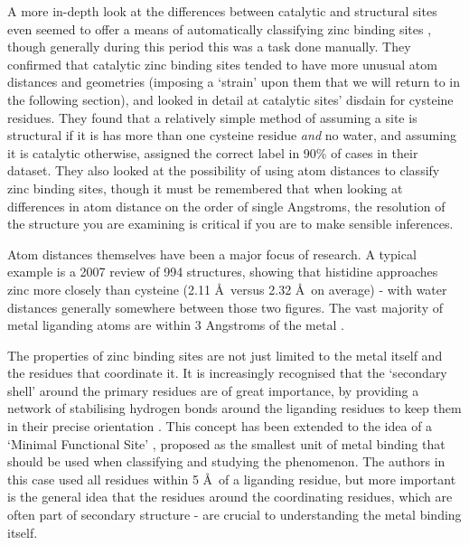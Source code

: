 A more in-depth look at the differences between catalytic and structural sites even seemed to offer a means of automatically classifying zinc binding sites \cite{lee2008physical}, though generally during this period this was a task done manually. They confirmed that catalytic zinc binding sites tended to have more unusual atom distances and geometries (imposing a `strain' upon them that we will return to in the following section), and looked in detail at catalytic sites' disdain for cysteine residues. They found that a relatively simple method of assuming a site is structural if it is has more than one cysteine residue \textit{and} no water, and assuming it is catalytic otherwise, assigned the correct label in 90\% of cases in their dataset. They also looked at the possibility of using atom distances to classify zinc binding sites, though it must be remembered that when looking at differences in atom distance on the order of single Angstroms, the resolution of the structure you are examining is critical if you are to make sensible inferences.

Atom distances themselves have been a major focus of research. A typical example is a 2007 review \cite{tamames2007analysis} of 994 structures, showing that histidine approaches zinc more closely than cysteine (2.11 \AA \ versus 2.32 \AA \ on average) - with water distances generally somewhere between those two figures. The vast majority of metal liganding atoms are within 3 Angstroms of the metal \cite{dokmanic2008metals}.

The properties of zinc binding sites are not just limited to the metal itself and the residues that coordinate it. It is increasingly recognised that the `secondary shell' around the primary residues are of great importance, by providing a network of stabilising hydrogen bonds around the liganding residues to keep them in their precise orientation \cite{auld2001zinc}. This concept has been extended to the idea of a `Minimal Functional Site' \cite{andreini2011minimal}, proposed as the smallest unit of metal binding that should be used when classifying and studying the phenomenon. The authors in this case used all residues within 5 \AA \ of a liganding residue, but more important is the general idea that the residues around the coordinating residues, which are often part of secondary structure - are crucial to understanding the metal binding itself.


